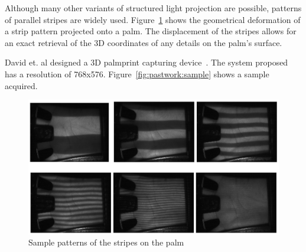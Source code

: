 Although many other variants of structured light projection are possible, patterns of parallel stripes are widely used. Figure~\ref{fig:pastwork:strippattern} shows the geometrical deformation of a strip pattern projected onto a palm. The displacement of the stripes allows for an exact retrieval of the 3D coordinates of any details on the palm's surface.

David et. al designed a 3D palmprint capturing device~\cite{Zhang:2008kc}. The system proposed has a resolution of 768x576. Figure~\ref{fig:pastwork:sample} shows a sample acquired.

\begin{figure}[htb]
  \begin{center}
    \includegraphics[width=0.9\linewidth]{ch-pastwork/figures/strippattern}
    \caption[Sample patterns of the stripes on the palm]{Sample patterns of the stripes on the palm~\cite{Li:2009eq}}
    \label{fig:pastwork:strippattern}
  \end{center}
\end{figure}
